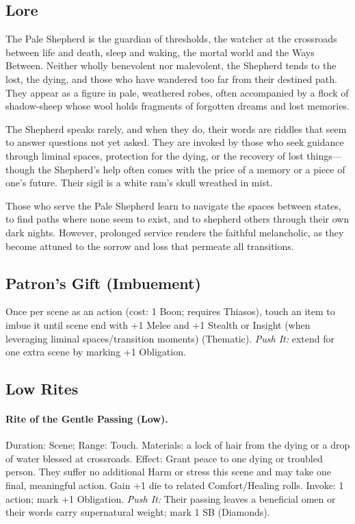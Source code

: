 \documentclass[11pt]{article}
\begin{document}
\subsection*{Lore}
The Pale Shepherd is the guardian of thresholds, the watcher at the crossroads between life and death, sleep and waking, the mortal world and the Ways Between. Neither wholly benevolent nor malevolent, the Shepherd tends to the lost, the dying, and those who have wandered too far from their destined path. They appear as a figure in pale, weathered robes, often accompanied by a flock of shadow-sheep whose wool holds fragments of forgotten dreams and lost memories.  

The Shepherd speaks rarely, and when they do, their words are riddles that seem to answer questions not yet asked. They are invoked by those who seek guidance through liminal spaces, protection for the dying, or the recovery of lost things---though the Shepherd's help often comes with the price of a memory or a piece of one's future. Their sigil is a white ram's skull wreathed in mist.  

Those who serve the Pale Shepherd learn to navigate the spaces between states, to find paths where none seem to exist, and to shepherd others through their own dark nights. However, prolonged service renders the faithful melancholic, as they become attuned to the sorrow and loss that permeate all transitions.

\subsection*{Patron's Gift (Imbuement)}
Once per scene as an action (cost: 1 Boon; requires Thiasos), touch an item to imbue it until scene end with +1 Melee and +1 Stealth or Insight (when leveraging liminal spaces/transition moments) (Thematic). \emph{Push It:} extend for one extra scene by marking +1 Obligation.

\subsection*{Low Rites}
\paragraph{Rite of the Gentle Passing (Low).} Duration: Scene; Range: Touch.  
Materials: a lock of hair from the dying or a drop of water blessed at crossroads.  
Effect: Grant peace to one dying or troubled person. They suffer no additional Harm or stress this scene and may take one final, meaningful action. Gain +1 die to related Comfort/Healing rolls.  
Invoke: 1 action; mark +1 Obligation.  
\emph{Push It:} Their passing leaves a beneficial omen or their words carry supernatural weight; mark 1 SB (Diamonds).  
\end{document}
